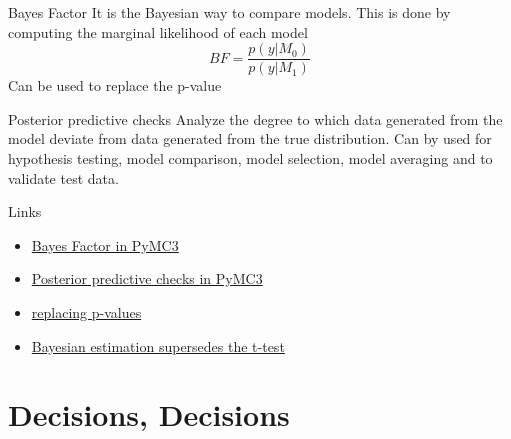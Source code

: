 \documentclass[table,dvipsnames]{beamer}
\newcommand{\keywd}{\textcolor{myorange}}
\newcommand{\highlt}{\textcolor{NavyBlue}}
\begin{document}
\begin{frame}[fragile]
 \footnotesize
 
 \begin{block}{Bayes Factor}
  It is the \keywd{Bayesian way} to compare models.   This is done by computing the marginal likelihood of each model 
  \begin{equation}
  BF = \frac{p(y|M_{0})}{p(y|M_{1})}
  \end{equation}
  \highlt{Can be used to replace the p-value}
 \end{block}

 \begin{block}{Posterior predictive checks}
  Analyze the degree to which data generated from the model deviate from data generated from the true distribution. Can by used for hypothesis testing, model comparison, model selection, model averaging and to validate test data.
 \end{block}

Links
\begin{itemize}
 \item \href{http://docs.pymc.io/notebooks/Bayes\_factor.html}{Bayes Factor in PyMC3}
 \item \href{http://docs.pymc.io/notebooks/posterior\_predictive.html}{Posterior predictive checks in PyMC3}
 \item \href{https://replicationindex.wordpress.com/2015/04/30/replacing-p-values-with-bayes-factors-a-miracle-cure-for-the-replicability-crisis-in-psychological-science/}{replacing p-values}
 \item \href{http://docs.pymc.io/notebooks/BEST.html}{Bayesian estimation supersedes the t-test}
\end{itemize}
\end{frame}

\section{Decisions, Decisions}
\subsection{}
\end{document}
